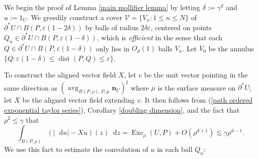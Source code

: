 \documentclass[reqno,11pt]{amsart}
\DeclareMathOperator{\avg}{avg}
\DeclareMathOperator{\Exc}{Exc}
\newcommand*\dif{\mathop{}\!\mathrm{d}}
\DeclareMathOperator{\dist}{dist}
\newcommand{\normal}{\mathbf n}
\newcommand{\dfn}[1]{\emph{#1}\index{#1}}
\newtheorem{lemma}[theorem]{Lemma}
\theoremstyle{definition}
\numberwithin{equation}{section}
\begin{document}


We begin the proof of Lemma \ref{main mollifier lemma} by letting $\delta := \gamma^d$ and $u := 1_U$.
We greedily construct a cover $\mathcal V = \{V_n: 1 \leq n \leq N\}$ of $\partial^* U \cap B(P, \varepsilon(1 - 2\delta))$ by balls of radius $2\delta\varepsilon$, centered on points $Q_n \in \partial^* U \cap B(P, \varepsilon(1 - \delta))$, which is \dfn{efficient} in the sense that each $Q \in \partial^*U \cap B(P, \varepsilon(1 - \delta))$ only lies in $O_d(1)$ balls $V_n$.
Let $V_0$ be the annulus $\{Q: \varepsilon(1 - \delta) \leq \dist(P, Q) \leq \varepsilon\}$.

To construct the aligned vector field $X$, let $v$ be the unit vector pointing in the same direction as $(\avg_{B(P, \rho), P, \mu} \normal_U)^\sharp$ where $\mu$ is the surface measure on $\partial^* U$; let $X$ be the aligned vector field extending $v$.
It then follows from (\ref{path ordered exponential taylor series}), Corollary \ref{doubling dimension}, and the fact that $\rho^2 \leq \gamma$ that 
\begin{equation}\label{hypothesis on mollifier sublemma}
\int_{B(P, \rho)} (|\dif u| - Xu)(z) \dif z = \Exc_\rho(U, P) + O(\rho^{d + 1}) \lesssim \gamma \rho^{d - 1}.
\end{equation}
We use this fact to estimate the convolution of $u$ in each ball $Q_n$:
\end{document}

